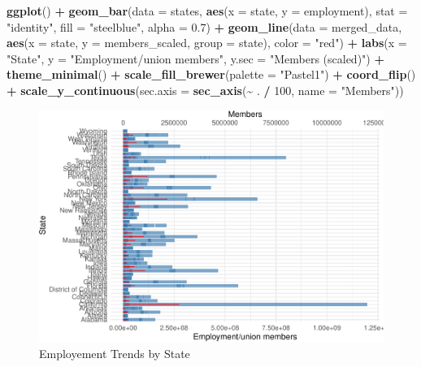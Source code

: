 \documentclass[
]{book}
\newenvironment{Shaded}{\begin{snugshade}}{\end{snugshade}}
\newcommand{\AttributeTok}[1]{\textcolor[rgb]{0.13,0.29,0.53}{#1}}
\newcommand{\DecValTok}[1]{\textcolor[rgb]{0.00,0.00,0.81}{#1}}
\newcommand{\FloatTok}[1]{\textcolor[rgb]{0.00,0.00,0.81}{#1}}
\newcommand{\FunctionTok}[1]{\textcolor[rgb]{0.13,0.29,0.53}{\textbf{#1}}}
\newcommand{\NormalTok}[1]{#1}
\newcommand{\SpecialCharTok}[1]{\textcolor[rgb]{0.81,0.36,0.00}{\textbf{#1}}}
\newcommand{\StringTok}[1]{\textcolor[rgb]{0.31,0.60,0.02}{#1}}
\theoremstyle{definition}
\theoremstyle{definition}
\theoremstyle{definition}
\theoremstyle{definition}
\theoremstyle{remark}
\begin{document}
\begin{Shaded}
\begin{Highlighting}[]
\FunctionTok{ggplot}\NormalTok{() }\SpecialCharTok{+}
  \FunctionTok{geom\_bar}\NormalTok{(}\AttributeTok{data =}\NormalTok{ states, }\FunctionTok{aes}\NormalTok{(}\AttributeTok{x =}\NormalTok{ state, }\AttributeTok{y =}\NormalTok{ employment), }
           \AttributeTok{stat =} \StringTok{"identity"}\NormalTok{, }\AttributeTok{fill =} \StringTok{"steelblue"}\NormalTok{, }\AttributeTok{alpha =} \FloatTok{0.7}\NormalTok{) }\SpecialCharTok{+}
  \FunctionTok{geom\_line}\NormalTok{(}\AttributeTok{data =}\NormalTok{ merged\_data, }
            \FunctionTok{aes}\NormalTok{(}\AttributeTok{x =}\NormalTok{ state, }\AttributeTok{y =}\NormalTok{ members\_scaled, }
                \AttributeTok{group =}\NormalTok{ state), }\AttributeTok{color =} \StringTok{"red"}\NormalTok{) }\SpecialCharTok{+}
  \FunctionTok{labs}\NormalTok{(}\AttributeTok{x =} \StringTok{"State"}\NormalTok{, }
       \AttributeTok{y =} \StringTok{"Employment/union members"}\NormalTok{, }\AttributeTok{y.sec =} \StringTok{"Members (scaled)"}\NormalTok{) }\SpecialCharTok{+}
  \FunctionTok{theme\_minimal}\NormalTok{() }\SpecialCharTok{+}
  \FunctionTok{scale\_fill\_brewer}\NormalTok{(}\AttributeTok{palette =} \StringTok{"Pastel1"}\NormalTok{) }\SpecialCharTok{+}
  \FunctionTok{coord\_flip}\NormalTok{() }\SpecialCharTok{+}
  \FunctionTok{scale\_y\_continuous}\NormalTok{(}\AttributeTok{sec.axis =} \FunctionTok{sec\_axis}\NormalTok{(}\SpecialCharTok{\textasciitilde{}}\NormalTok{ . }\SpecialCharTok{/} \DecValTok{100}\NormalTok{, }\AttributeTok{name =} \StringTok{"Members"}\NormalTok{))}
\end{Highlighting}
\end{Shaded}

\begin{figure}
\centering
\includegraphics{_main_files/figure-latex/employmenttrend-1.pdf}
\caption{\label{fig:employmenttrend}Employement Trends by State}
\end{figure}
\end{document}
